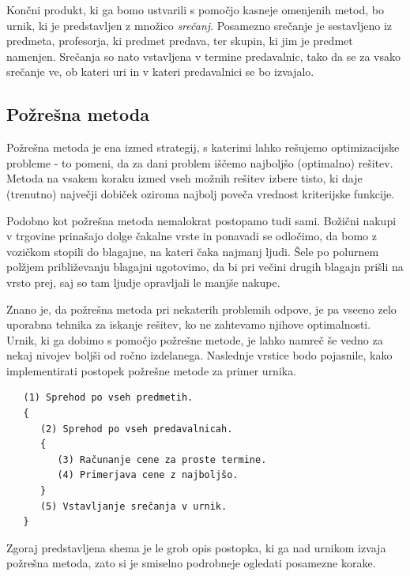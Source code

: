 \documentclass[a4paper,10pt]{article}
\begin{document}
Končni produkt, ki ga bomo ustvarili s pomočjo kasneje omenjenih metod, bo urnik, ki je
predstavljen z množico \emph{srečanj}. Posamezno srečanje je sestavljeno iz predmeta,
profesorja, ki predmet predava, ter skupin, ki jim je predmet namenjen. Srečanja so nato
vstavljena v termine predavalnic, tako da se za vsako srečanje ve, ob kateri uri in v
kateri predavalnici se bo izvajalo.

\subsection{Požrešna metoda}

Požrešna metoda je ena izmed strategij, s katerimi lahko rešujemo optimizacijske probleme -
to pomeni, da za dani problem iščemo najboljšo (optimalno) rešitev. Metoda na vsakem koraku
izmed vseh možnih rešitev izbere  tisto, ki daje (trenutno) največji dobiček oziroma najbolj
poveča vrednost kriterijske funkcije.

Podobno kot požrešna metoda nemalokrat postopamo tudi sami. Božični nakupi v trgovine
prinašajo dolge čakalne vrste in ponavadi se odločimo, da bomo z vozičkom stopili do blagajne,
na kateri čaka najmanj ljudi. Šele po polurnem polžjem približevanju blagajni ugotovimo,
da bi pri večini drugih blagajn prišli na vrsto prej, saj so tam ljudje opravljali le
manjše nakupe.

Znano je, da požrešna metoda pri nekaterih problemih odpove, je pa vseeno zelo uporabna
tehnika za iskanje rešitev, ko ne zahtevamo njihove optimalnosti. Urnik, ki ga dobimo s
pomočjo požrešne metode, je lahko namreč še vedno za nekaj nivojev boljši od ročno izdelanega.
Naslednje vrstice bodo pojasnile, kako implementirati postopek požrešne metode za primer urnika.

\begin{verbatim}
   (1) Sprehod po vseh predmetih.
   {
      (2) Sprehod po vseh predavalnicah.
      {
         (3) Računanje cene za proste termine.
         (4) Primerjava cene z najboljšo.
      }
      (5) Vstavljanje srečanja v urnik.
   }
\end{verbatim}

\noindent 
Zgoraj predstavljena shema je le grob opis postopka, ki ga nad urnikom izvaja požrešna metoda,
zato si je smiselno podrobneje ogledati posamezne korake.
\end{document}
